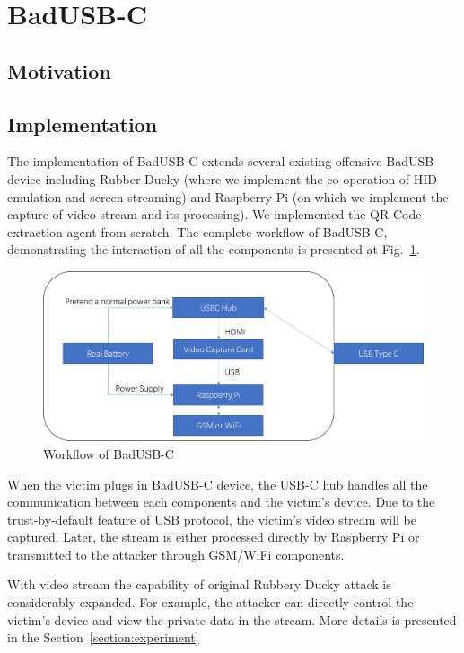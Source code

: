 \section{BadUSB-C}

\subsection{Motivation}

\subsection{Implementation}
The implementation of BadUSB-C extends several existing offensive BadUSB device including Rubber Ducky (where we implement the co-operation of HID emulation and screen streaming) and Raspberry Pi (on which we implement the capture of video stream and its processing). We implemented the QR-Code extraction agent from scratch. The complete workflow of BadUSB-C, demonstrating the interaction of all the components is presented at Fig.~\ref{workflow}.

\begin{figure}[htbp]
\includegraphics[width=\linewidth]{./Figs/workflow.png}
\caption{Workflow of BadUSB-C}
\label{workflow}
\end{figure}

When the victim plugs in BadUSB-C device, the USB-C hub handles all the communication between each components and the victim's device. Due to the trust-by-default feature of USB protocol, the victim's video stream will be captured. Later, the stream is either processed directly by Raspberry Pi or transmitted to the attacker through GSM/WiFi components.

With video stream the capability of original Rubbery Ducky attack is considerably expanded. For example, the attacker can directly control the victim's device and view the private data in the stream. More details is presented in the Section~\ref{section:experiment}